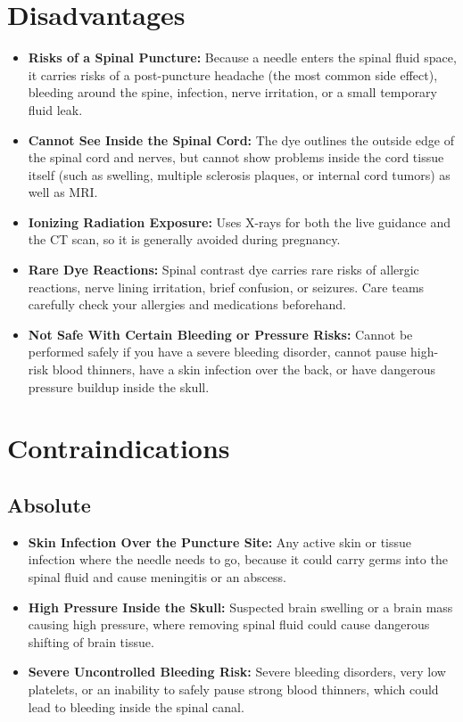 \section{Disadvantages}
\begin{itemize}
    \item \textbf{Risks of a Spinal Puncture:} Because a needle enters the spinal fluid space, it carries risks of a post-puncture headache (the most common side effect), bleeding around the spine, infection, nerve irritation, or a small temporary fluid leak.
    \item \textbf{Cannot See Inside the Spinal Cord:} The dye outlines the outside edge of the spinal cord and nerves, but cannot show problems inside the cord tissue itself (such as swelling, multiple sclerosis plaques, or internal cord tumors) as well as MRI.
    \item \textbf{Ionizing Radiation Exposure:} Uses X-rays for both the live guidance and the CT scan, so it is generally avoided during pregnancy.
    \item \textbf{Rare Dye Reactions:} Spinal contrast dye carries rare risks of allergic reactions, nerve lining irritation, brief confusion, or seizures. Care teams carefully check your allergies and medications beforehand.
    \item \textbf{Not Safe With Certain Bleeding or Pressure Risks:} Cannot be performed safely if you have a severe bleeding disorder, cannot pause high-risk blood thinners, have a skin infection over the back, or have dangerous pressure buildup inside the skull.
\end{itemize}

\section{Contraindications}

\subsection{Absolute}
\begin{itemize}
    \item \textbf{Skin Infection Over the Puncture Site:} Any active skin or tissue infection where the needle needs to go, because it could carry germs into the spinal fluid and cause meningitis or an abscess.
    \item \textbf{High Pressure Inside the Skull:} Suspected brain swelling or a brain mass causing high pressure, where removing spinal fluid could cause dangerous shifting of brain tissue.
    \item \textbf{Severe Uncontrolled Bleeding Risk:} Severe bleeding disorders, very low platelets, or an inability to safely pause strong blood thinners, which could lead to bleeding inside the spinal canal.
\end{itemize}

